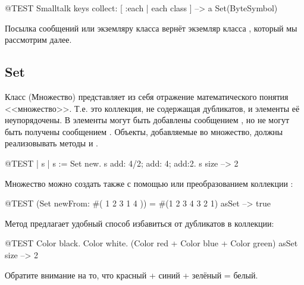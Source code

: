 \documentclass[a4paper,10pt,twoside]{book}
\begin{document}
\begin{code}{@TEST}
Smalltalk keys collect: [ :each | each class ] --> a Set(ByteSymbol)
\end{code}
\noindent
Посылка сообщений  или  экземляру класса  вернёт экземляр класса , который мы рассмотрим далее.

\subsection{Set}
Класс  (Множество) представляет из себя отражение математического понятия <<множество>>. Т.е. это коллекция, не содержащая дубликатов, и элементы её неупорядочены. В  элементы могут быть добавлены сообщением , но не могут быть получены сообщением . Объекты, добавляемые во множество, должны реализовывать методы  и \ct{=}.

\begin{code}{@TEST | s | }
s := Set new.
s add: 4/2; add: 4; add:2.
s size --> 2
\end{code}

Множество можно создать также с помощью  или преобразованием коллекции :

\begin{code}{@TEST}
(Set newFrom: #( 1 2 3 1 4 )) = #(1 2 3 4 3 2 1) asSet --> true
\end{code}

Метод  предлагает удобный способ избавиться от дубликатов в коллекции:
\begin{code}{@TEST}
{ Color black. Color white. (Color red + Color blue + Color green) } asSet size --> 2
\end{code}
\noindent
Обратите внимание на то, что красный + синий + зелёный = белый.
\end{document}
